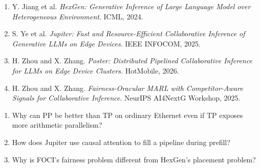 \documentclass[10pt,a4paper]{article}
\newcommand{\paper}[1]{\textit{#1}}
\begin{document}
\begin{enumerate}
  \item Y. Jiang et al. \paper{HexGen: Generative Inference of Large Language Model over Heterogeneous Environment}. ICML, 2024.
  \item S. Ye et al. \paper{Jupiter: Fast and Resource-Efficient Collaborative Inference of Generative LLMs on Edge Devices}. IEEE INFOCOM, 2025.
  \item H. Zhou and X. Zhang. \paper{Poster: Distributed Pipelined Collaborative Inference for LLMs on Edge Device Clusters}. HotMobile, 2026.
  \item H. Zhou and X. Zhang. \paper{Fairness-Oracular MARL with Competitor-Aware Signals for Collaborative Inference}. NeurIPS AI4NextG Workshop, 2025.
\end{enumerate}

\begin{checkbox}
\begin{enumerate}
  \item Why can PP be better than TP on ordinary Ethernet even if TP exposes more arithmetic parallelism?
  \item How does Jupiter use causal attention to fill a pipeline during prefill?
  \item Why is FOCI's fairness problem different from HexGen's placement problem?
\end{enumerate}
\end{checkbox}
\end{document}
